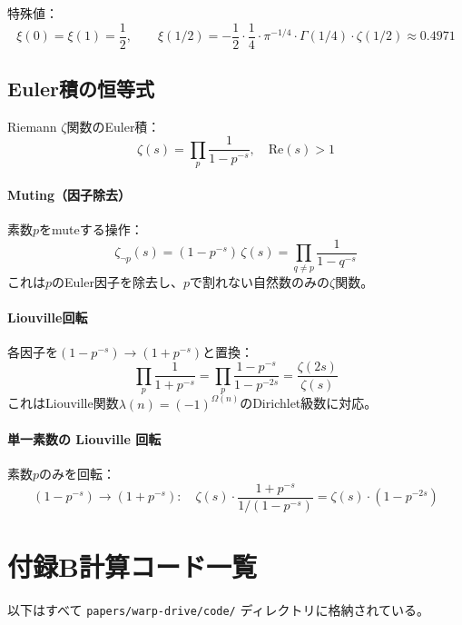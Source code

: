 \documentclass[11pt,a4paper]{article}
\begin{document}
特殊値：
\[
\xi(0) = \xi(1) = \frac{1}{2}, \qquad
\xi(1/2) = -\frac{1}{2}\cdot\frac{1}{4}\cdot\pi^{-1/4}\cdot\Gamma(1/4)\cdot\zeta(1/2)
\approx 0.4971
\]


\subsection{Euler積の恒等式}

Riemann $\zeta$関数のEuler積：
\[
\zeta(s) = \prod_p \frac{1}{1 - p^{-s}}, \quad \mathrm{Re}(s) > 1
\]

\paragraph{Muting（因子除去）}
素数$p$をmuteする操作：
\[
\zeta_{\neg p}(s) = (1 - p^{-s})\,\zeta(s) = \prod_{q \neq p} \frac{1}{1 - q^{-s}}
\]
これは$p$のEuler因子を除去し、$p$で割れない自然数のみの$\zeta$関数。

\paragraph{Liouville回転}
各因子を$(1 - p^{-s}) \to (1 + p^{-s})$と置換：
\[
\prod_p \frac{1}{1 + p^{-s}} = \prod_p \frac{1 - p^{-s}}{1 - p^{-2s}}
= \frac{\zeta(2s)}{\zeta(s)}
\]
これはLiouville関数$\lambda(n) = (-1)^{\Omega(n)}$のDirichlet級数に対応。

\paragraph{単一素数の Liouville 回転}
素数$p$のみを回転：
\[
(1 - p^{-s}) \to (1 + p^{-s}): \quad
\zeta(s) \cdot \frac{1 + p^{-s}}{1/(1 - p^{-s})}
= \zeta(s) \cdot (1 - p^{-2s})
\]



\section{付録B\quad 計算コード一覧}
\label{app:code}

以下はすべて \texttt{papers/warp-drive/code/} ディレクトリに格納されている。
\end{document}
